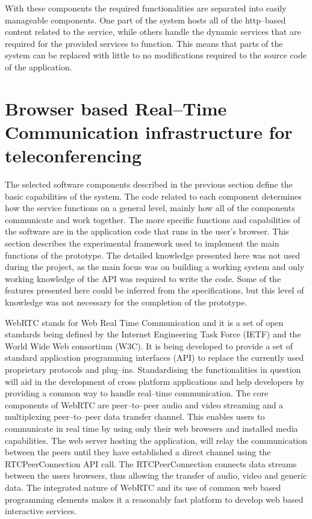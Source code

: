 \documentclass[english,12pt,a4paper,pdftex]{article}
\begin{document}
With these components the required functionalities are separated into easily manageable components. One part of the system hosts all of the http--based content related to the service, while others handle the dynamic services that are required for the provided services to function. This means that parts of the system can be replaced with little to no modifications required to the source code of the application.

\clearpage

\section{Browser based Real--Time Communication infrastructure for teleconferencing}

The selected software components described in the previous section define the basic capabilities of the system. The code related to each component determines how the service functions on a general level, mainly how all of the components communicate and work together. The more specific functions and capabilities of the software are in the application code that runs in the user's browser. This section describes the experimental framework used to implement the main functions of the prototype. The detailed knowledge presented here was not used during the project, as the main focus was on building a working system and only working knowledge of the API was required to write the code. Some of the features presented here could be inferred from the specifications, but this level of knowledge was not necessary for the completion of the prototype.

WebRTC stands for Web Real Time Communication and it is a set of open standards being defined by the Internet Engineering Task Force (IETF) and the World Wide Web consortium (W3C). It is being developed to provide a set of standard application programming interfaces (API) to replace the currently used proprietary protocols and plug--ins. Standardising the functionalities in question will aid in the development of cross platform applications and help developers by providing a common way to handle real--time communication. The core components of WebRTC are peer--to--peer audio and video streaming and a multiplexing peer--to--peer data transfer channel. This enables users to communicate in real time by using only their web browsers and installed media capabilities. The web server hosting the application, will relay the communication between the peers until they have established a direct channel using the RTCPeerConnection API call. The RTCPeerConnection connects data streams between the users browsers, thus allowing the transfer of audio, video and generic data. \cite{Jennings} The integrated nature of WebRTC and its use of common web based programming elements makes it a reasonably fast platform to develop web based interactive services.
\end{document}
